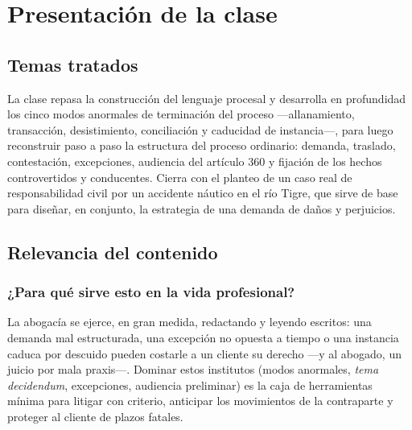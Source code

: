 \documentclass[12pt,oneside]{book}
\begin{document}
\tableofcontents

\chapter*{Presentación de la clase}

\section{Temas tratados}

La clase repasa la construcción del lenguaje procesal y desarrolla en profundidad los cinco modos anormales de terminación del proceso ---allanamiento, transacción, desistimiento, conciliación y caducidad de instancia---, para luego reconstruir paso a paso la estructura del proceso ordinario: demanda, traslado, contestación, excepciones, audiencia del artículo 360 y fijación de los hechos controvertidos y conducentes. Cierra con el planteo de un caso real de responsabilidad civil por un accidente náutico en el río Tigre, que sirve de base para diseñar, en conjunto, la estrategia de una demanda de daños y perjuicios.

\section{Relevancia del contenido}

\subsection{¿Para qué sirve esto en la vida profesional?}

La abogacía se ejerce, en gran medida, redactando y leyendo escritos: una demanda mal estructurada, una excepción no opuesta a tiempo o una instancia caduca por descuido pueden costarle a un cliente su derecho ---y al abogado, un juicio por mala praxis---. Dominar estos institutos (modos anormales, \textit{tema decidendum}, excepciones, audiencia preliminar) es la caja de herramientas mínima para litigar con criterio, anticipar los movimientos de la contraparte y proteger al cliente de plazos fatales.
\end{document}
